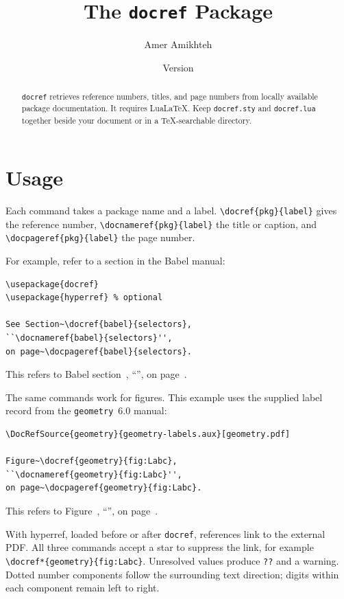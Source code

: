 \documentclass{article}
\title{The \texttt{docref} Package}
\author{Amer Amikhteh}
\date{Version \pkgmeta[version]{docref}\\[2pt]\dmc{docref}{long}}
\begin{document}
\maketitle

\begin{abstract}
    \noindent\texttt{docref} retrieves reference numbers, titles, and page numbers
    from locally available package documentation. It requires LuaLaTeX.
    Keep \texttt{docref.sty} and \texttt{docref.lua} together beside your document
    or in a TeX-searchable directory.
\end{abstract}

\section{Usage}\label{sec:hyperlinks}
Each command takes a package name and a label.
\verb|\docref{pkg}{label}| gives the reference number,
\verb|\docnameref{pkg}{label}| the title or caption, and
\verb|\docpageref{pkg}{label}| the page number.

For example, refer to a section in the Babel manual:
\begin{verbatim}
\usepackage{docref}
\usepackage{hyperref} % optional

See Section~\docref{babel}{selectors},
``\docnameref{babel}{selectors}'',
on page~\docpageref{babel}{selectors}.
\end{verbatim}

This refers to Babel section~,
``'', on page~.

The same commands work for figures. This example uses the supplied label
record from the \texttt{geometry}~6.0 manual:
\begin{verbatim}
\DocRefSource{geometry}{geometry-labels.aux}[geometry.pdf]

Figure~\docref{geometry}{fig:Labc},
``\docnameref{geometry}{fig:Labc}'',
on page~\docpageref{geometry}{fig:Labc}.
\end{verbatim}

This refers to Figure~,
``'', on page~.

With \textsf{hyperref}, loaded before or after \texttt{docref}, references
link to the external PDF. All three commands accept a star to suppress the
link, for example \verb|\docref*{geometry}{fig:Labc}|.
Unresolved values produce \texttt{??} and a warning.
Dotted number components follow the surrounding text direction; digits
within each component remain left to right.
\end{document}
